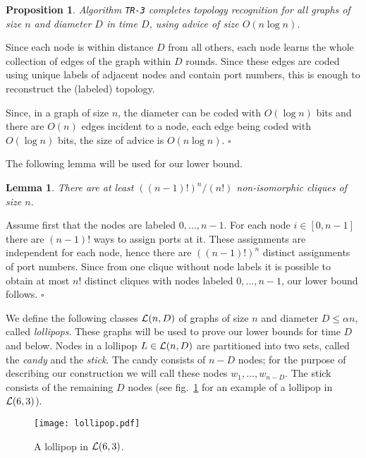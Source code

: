 \documentclass{article}
\newcommand{\cL}{{\cal L}}
\newcommand*{\qed}{\hfill\ensuremath{\square}}
\newtheorem{lemma}{Lemma}[section]
\newtheorem{proposition}{Proposition}[section]
\newenvironment{proof}{\noindent{\bf Proof:}}{\qed}
\begin{document}
\begin{proposition}\label{ubTimeD}
Algorithm {\tt TR-3} completes topology recognition for all graphs of size $n$ and diameter $D$ in time $D$, using advice of size $O(n \log n)$.
\end{proposition}
\begin{proof}
Since each node is within distance $D$ from all others, each node learns the whole collection of edges of the graph within $D$ rounds.
Since these edges are coded using unique labels of adjacent nodes and contain port numbers, this is enough to reconstruct the (labeled) topology.

Since, in a graph of size $n$, the diameter  can be coded with $O(\log n)$ bits and there are $O(n)$ edges incident to a node, each edge being coded with $O(\log n)$ bits, the size of advice is $O(n \log n)$.
\end{proof}




The following lemma will be used for our lower bound.

\begin{lemma}\label{cliques}
There are at least {$((n-1)!)^n/(n!)$ non-isomorphic cliques of size $n$.}\end{lemma}
\begin{proof}
{Assume first that the nodes are labeled $0, \ldots, n-1$. For each node $i\in [0, n-1]$ there are $(n-1)!$ ways to assign ports at it. These assignments are independent for each node, hence there are $((n-1)!)^n$ distinct assignments of port numbers.
Since from one clique without node labels it is possible to obtain at most $n!$ distinct cliques with nodes labeled $0,\ldots,n-1$, our lower bound follows.}
\end{proof}

We define the following classes $\cL(n,D)$ of graphs of size $n$ and diameter $D\le \alpha n$, called {\it lollipops}.
These graphs will be used to prove our lower bounds for time $D$ and below.
Nodes in a  lollipop $L \in \cL(n,D)$ are partitioned into two sets, called the {\em candy} and the {\em stick}.
The candy consists of $n-D$ nodes; for the purpose of describing our construction we will call these nodes $w_1,\ldots, w_{n-D}$. The stick consists of the remaining $D$ nodes {(see fig.~\ref{fig.lollipop} for an example of a lollipop in $\cL(6,3)$)}. 

\begin{figure}
\centering
\texttt{[image: lollipop.pdf]}
\caption{\label{fig.lollipop} A lollipop in $\cL(6,3)$.}
\end{figure}
\end{document}
